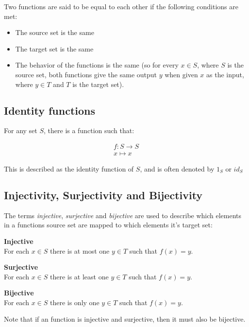 Two functions are said to be equal to each other if the following conditions are
met:

\begin{itemize}
	\item The source set is the same
	\item The target set is the same
	\item The behavior of the functions is the same (so for every $x \in S$, 
		  where $S$ is the source set, both functions give the same output $y$
		  when given $x$ as the input, where $y \in T$ and $T$ is the target
		  set).
\end{itemize}

\subsection*{Identity functions}

For any set $S$, there is a function such that:

\[
	\begin{split}
	f:S \rightarrow S\\
	x \longmapsto x
	\end{split}
\]	

This is described as the identity function of $S$, and is often denoted by $1_S$
or $id_S$

\subsection*{Injectivity, Surjectivity and Bijectivity}

The terms {\it injective}, {\it surjective} and {\it bijective} are used to
describe which elements in a functions source set are mapped to which elements
it's target set:

\begin{description}
	\item {\bf Injective}\\
		For each $x \in S$ there is at most one $y \in T$ such that $f(x) = y$.
	\item {\bf Surjective}\\
		For each $x \in S$ there is at least one $y \in T$ such that $f(x) = y$.
	\item {\bf Bijective}\\
		For each $x \in S$ there is only one $y \in T$ such that $f(x) = y$.
\end{description}

Note that if an function is injective and surjective, then it must also be
bijective.

